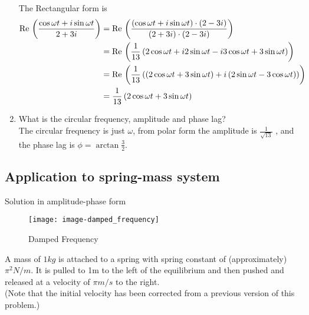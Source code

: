 \begin{enumerate}
  The Rectangular form is 
  \begin{align*}
    \displaystyle \mathrm{Re\, } \left( \frac{\cos \omega t + i \sin \omega t}{2 + 3i} \right)
    \displaystyle &=  \displaystyle \mathrm{Re\, } \left(
                    \frac{(\cos \omega t + i \sin \omega t) \cdot (2 - 3i)} 
                    {(2 + 3i) \cdot (2 - 3i)} \right)\\
    \displaystyle &= \displaystyle \mathrm{Re\, } \left( \frac{1}{13}
                    \left(2 \cos \omega t + i 2 \sin \omega t -i 3 \cos \omega t
                    + 3 \sin \omega t \right) \right) \\
    \displaystyle &= \displaystyle \mathrm{Re\, } \left( \frac{1}{13}
                    \left( \left( 2 \cos \omega t + 3 \sin \omega t \right)
                    + i \left(2 \sin \omega t - 3 \cos \omega t \right) \right) \right) \\
    \displaystyle &= \frac{1}{13} \left( 2 \cos \omega t + 3 \sin \omega t \right)
  \end{align*}

\item What is the circular frequency, amplitude and phase lag?\\

  The circular frequency is just $\omega$,
  from polar form the amplitude is $\displaystyle \frac{1}{\sqrt{13}}$
  , and the phase lag is $\phi = \arctan \frac{3}{2}$. 
\end{enumerate}
\clearpage

\subsection{Application to spring-mass system}
\begin{exercise}
  Solution in amplitude-phase form
\end{exercise}

\begin{figure}[ht!]
  \centering
  \texttt{[image: image-damped\_frequency]}
  \caption{Damped Frequency}
\end{figure}

A mass of $1 kg$ is attached to a spring with spring constant of (approximately)
$\pi^2 N/m$. It is pulled to 1m to the left of the equilibrium and then pushed and released
at a velocity of $\pi m/s$ to the right.\\

(Note that the initial velocity has been corrected from a previous version of this problem.)\\

